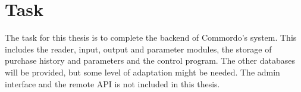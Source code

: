 
\section{Task}\label{sec:task}

The task for this thesis is to complete the backend of Commordo's system. This includes the reader, input, output and parameter modules, the storage of purchase history and parameters and the control program. The other databases will be provided, but some level of adaptation might be needed. The admin interface and the remote API is not included in this thesis.

